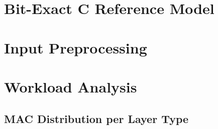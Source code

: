 \section{Bit-Exact C Reference Model}
\label{sec:c-model}

\section{Input Preprocessing}
\label{sec:preproc}

\section{Workload Analysis}
\label{sec:workload}

\subsection{MAC Distribution per Layer Type}
\label{sec:mac-dist}

